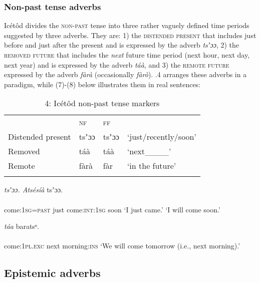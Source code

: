 \subsubsection{Non-past tense adverbs}

Icétôd divides the \textsc{non-past} tense into three rather vaguely defined time periods suggested by three adverbs. They are: 1) the \textsc{distended} \textsc{present} that includes just before and just after the present and is expressed by the adverb \textit{tsʼɔɔ}, 2) the \textsc{removed future} that includes the \textit{next} future time period (next hour, next day, next year) and is expressed by the adverb \textit{táà}, and 3) the \textsc{remote future} expressed by the adverb \textit{fàrà} (occasionally \textit{fàrò}). .4 arranges these adverbs in a paradigm, while (7)-(8) below illustrates them in real sentences:


\begin{table}
\caption{4: Icétôd non-past tense markers}
\label{tab:9}


\begin{tabularx}{\textwidth}{XXXX} & \textsc{nf} & \textsc{ff} & \\
\lsptoprule
Distended present & tsʼɔɔ & tsʼɔɔ & ‘just/recently/soon’\\
Removed & táà & táà & ‘next\_\_\_\_’\\
Remote & fàrà & fàr & ‘in the future’\\
\lspbottomrule
\end{tabularx}
\end{table}



\ea\label{ex:}
     \textit{tsʼɔɔ}\textit{.    Atsésíà}     tsʼɔɔ. \\
    \\
come:\textsc{1sg=past}   just    come:\textsc{int:1sg}   soon
\glt ‘I just came.’      ‘I will come soon.’ 
\z




\ea\label{ex:}
     \textit{táa}   baratsᵒ. \\
    \\
come:\textsc{1pl.exc}   next   morning:\textsc{ins}
\glt ‘We will come tomorrow (i.e., next morning).’ 
\z






\subsection{Epistemic adverbs}
